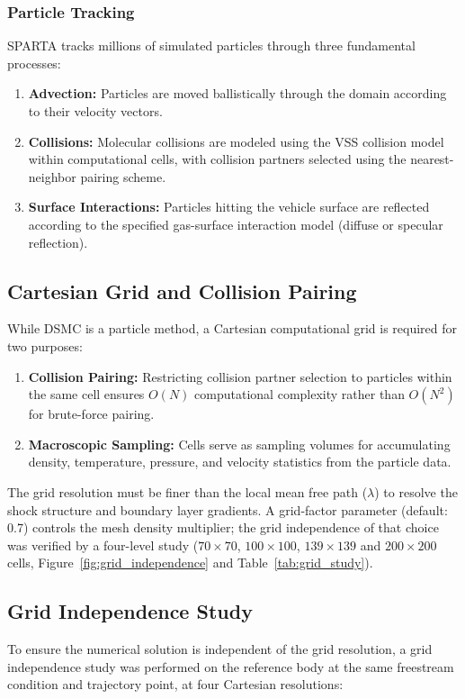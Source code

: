 \subsubsection*{Particle Tracking}
SPARTA tracks millions of simulated particles through three fundamental processes:
\begin{enumerate}
    \item \textbf{Advection:} Particles are moved ballistically through the domain according to their velocity vectors.
    \item \textbf{Collisions:} Molecular collisions are modeled using the VSS collision model within computational cells, with collision partners selected using the nearest-neighbor pairing scheme.
    \item \textbf{Surface Interactions:} Particles hitting the vehicle surface are reflected according to the specified gas-surface interaction model (diffuse or specular reflection).
\end{enumerate}

\subsection{Cartesian Grid and Collision Pairing}
While DSMC is a particle method, a Cartesian computational grid is required for two purposes:
\begin{enumerate}
    \item \textbf{Collision Pairing:} Restricting collision partner selection to particles within the same cell ensures $O(N)$ computational complexity rather than $O(N^2)$ for brute-force pairing.
    \item \textbf{Macroscopic Sampling:} Cells serve as sampling volumes for accumulating density, temperature, pressure, and velocity statistics from the particle data.
\end{enumerate}

The grid resolution must be finer than the local mean free path ($\lambda$) to resolve the shock structure and boundary layer gradients. A grid-factor parameter (default: 0.7) controls the mesh density multiplier; the grid independence of that choice was verified by a four-level study ($70\times70$, $100\times100$, $139\times139$ and $200\times200$ cells, Figure~\ref{fig:grid_independence} and Table~\ref{tab:grid_study}).

\subsection{Grid Independence Study}
To ensure the numerical solution is independent of the grid resolution, a grid independence study was performed on the reference body at the same freestream condition and trajectory point, at four Cartesian resolutions:

